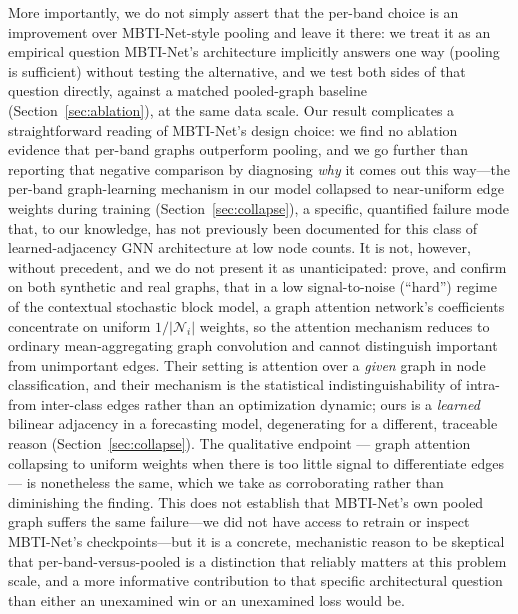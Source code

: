 \documentclass[journal]{IEEEtran}
\begin{document}
\begin{table}[t]
\end{table} More importantly, we do not simply assert that the per-band choice is an improvement over MBTI-Net-style pooling and leave it there: we treat it as an empirical question MBTI-Net's architecture implicitly answers one way (pooling is sufficient) without testing the alternative, and we test both sides of that question directly, against a matched pooled-graph baseline (Section~\ref{sec:ablation}), at the same data scale. Our result complicates a straightforward reading of MBTI-Net's design choice: we find no ablation evidence that per-band graphs outperform pooling, and we go further than reporting that negative comparison by diagnosing \emph{why} it comes out this way---the per-band graph-learning mechanism in our model collapsed to near-uniform edge weights during training (Section~\ref{sec:collapse}), a specific, quantified failure mode that, to our knowledge, has not previously been documented for this class of learned-adjacency GNN architecture at low node counts. It is not, however, without precedent, and we do not present it as unanticipated: \citet{Fountoulakis2023} prove, and confirm on both synthetic and real graphs, that in a low signal-to-noise (``hard'') regime of the contextual stochastic block model, a graph attention network's coefficients concentrate on uniform $1/|\mathcal{N}_i|$ weights, so the attention mechanism reduces to ordinary mean-aggregating graph convolution and cannot distinguish important from unimportant edges. Their setting is attention over a \emph{given} graph in node classification, and their mechanism is the statistical indistinguishability of intra- from inter-class edges rather than an optimization dynamic; ours is a \emph{learned} bilinear adjacency in a forecasting model, degenerating for a different, traceable reason (Section~\ref{sec:collapse}). The qualitative endpoint --- graph attention collapsing to uniform weights when there is too little signal to differentiate edges --- is nonetheless the same, which we take as corroborating rather than diminishing the finding. This does not establish that MBTI-Net's own pooled graph suffers the same failure---we did not have access to retrain or inspect MBTI-Net's checkpoints---but it is a concrete, mechanistic reason to be skeptical that per-band-versus-pooled is a distinction that reliably matters at this problem scale, and a more informative contribution to that specific architectural question than either an unexamined win or an unexamined loss would be.

\end{document}

